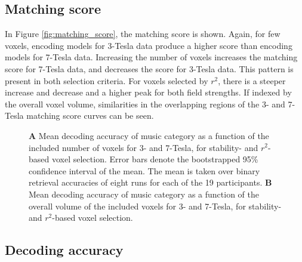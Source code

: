 \subsection*{Matching score}

In Figure \ref{fig:matching_score}, the matching score is shown. Again, for few
voxels, encoding models for 3-Tesla data produce a higher score than encoding
models for 7-Tesla data. Increasing the number of voxels increases the matching
score for 7-Tesla data, and decreases the score for 3-Tesla data. This pattern
is present in both selection criteria. For voxels selected by $r^2$, there is a
steeper increase and decrease and a higher peak for both field strengths.  If
indexed by the overall voxel volume, similarities in the overlapping regions of
the 3- and 7-Tesla matching score curves can be seen.

\begin{figure}
  \centering
  \def\svgwidth{\linewidth}
  
	
  \caption{\textbf{A} Mean decoding accuracy of music category as a function of
  the included number of voxels for 3- and 7-Tesla, for stability- and
  $r^2$-based voxel selection. Error bars denote the bootstrapped 95\%
  confidence interval of the mean. The mean is taken over binary retrieval
  accuracies of eight runs for each of the 19 participants. \textbf{B} Mean
decoding accuracy of music category as a function of the overall volume of the
included voxels for 3- and 7-Tesla, for stability- and $r^2$-based voxel
selection.
}

 \label{fig:decoding_accuracy}
\end{figure}


\subsection*{Decoding accuracy}

